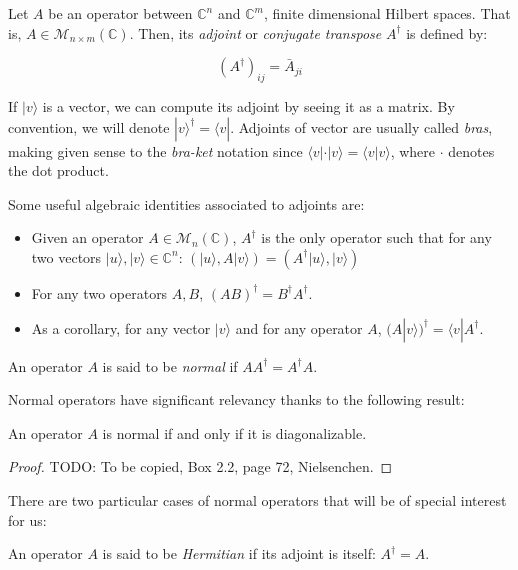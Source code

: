 \documentclass{article}
\begin{document}
	\begin{definition}
		Let $A$ be an operator between $\mathds{C}^n$ and $\mathds{C}^m$, finite dimensional Hilbert spaces. That is, $A \in \mathcal{M}_{n{\times}m}(\mathds{C})$. Then, its \emph{adjoint} or \emph{conjugate transpose} $A^\dagger$ is defined by:
		
		$$ (A^\dagger)_{ij} = \bar A_{ji} $$
	\end{definition}
	
	If $|v\rangle$ is a vector, we can compute its adjoint by seeing it as a matrix. By convention, we will denote $|v\rangle^\dagger = \langle v|$. Adjoints of vector are usually called \emph{bras}, making given sense to the \emph{bra-ket} notation since $\langle v| \cdot |v\rangle = \langle v|v\rangle$, where $\cdot$ denotes the dot product.
	
	Some useful algebraic identities associated to adjoints are:
	
	\begin{itemize}
		\item Given an operator $A \in \mathcal{M}_{n}(\mathds{C})$, $A^\dagger$ is the only operator such that for any two vectors $|u\rangle, |v\rangle \in \mathds{C}^n$: $( |u\rangle, A|v\rangle) = ( A^\dagger |u\rangle, |v\rangle)$
		\item For any two operators $A,B$, $(AB)^\dagger = B^\dagger A^\dagger$.
		\item As a corollary, for any vector $|v\rangle$ and for any operator $A$, $(A|v\rangle)^\dagger = \langle v|A^\dagger$.
	\end{itemize}
	
	\begin{definition}
		An operator $A$ is said to be \emph{normal} if $AA^\dagger = A^\dagger A$.
	\end{definition}
	
	Normal operators have significant relevancy thanks to the following result:
	
	\begin{theorem}
		An operator $A$ is normal if and only if it is diagonalizable.
	\end{theorem}
	\begin{proof}
		TODO: To be copied, Box 2.2, page 72, Nielsenchen.
	\end{proof}
	
	There are two particular cases of normal operators that will be of special interest for us:
	
	\begin{definition}
		An operator $A$ is said to be \emph{Hermitian} if its adjoint is itself: $A^\dagger = A$.
	\end{definition}
	
\end{document}
